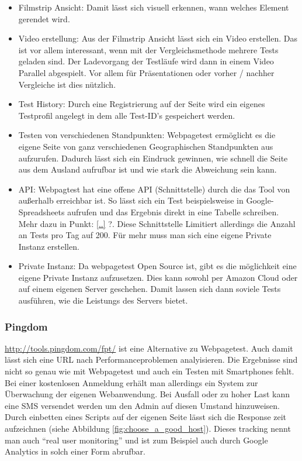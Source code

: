 \begin{itemize}
				\item Filmstrip Ansicht: Damit lässt sich visuell erkennen, wann welches Element gerendet wird.

				\item Video erstellung: Aus der Filmstrip Ansicht lässt sich ein Video erstellen. Das ist vor allem interessant, wenn mit der Vergleichsmethode mehrere Tests geladen sind. Der Ladevorgang der Testläufe wird dann in einem Video Parallel abgespielt. Vor allem für Präsentationen oder vorher / nachher Vergleiche ist dies nützlich.

				\item Test History: Durch eine Registrierung auf der Seite wird ein eigenes Testprofil angelegt in dem alle Test-ID's gespeichert werden.

				\item Testen von verschiedenen Standpunkten: Webpagetest ermöglicht es die eigene Seite von ganz verschiedenen Geographischen Standpunkten aus aufzurufen. Dadurch lässt sich ein Eindruck gewinnen, wie schnell die Seite aus dem Ausland aufrufbar ist und wie stark die Abweichung sein kann.

				\item API: Webpagtest hat eine offene API (Schnittstelle) durch die das Tool von außerhalb erreichbar ist. So lässt sich ein Test beispielsweise in Google-Spreadsheets aufrufen und das Ergebnis direkt in eine Tabelle schreiben. Mehr dazu in Punkt: \ref{..} ?. Diese Schnittstelle Limitiert allerdings die Anzahl an Tests pro Tag auf 200. Für mehr muss man sich eine eigene Private Instanz erstellen. 

				\item Private Instanz: Da webpagetest Open Source ist, gibt es die möglichkeit eine eigene Private Instanz aufzusetzen. Dies kann sowohl per Amazon Cloud oder auf einem eigenen Server geschehen. Damit lassen sich dann soviele Tests ausführen, wie die Leistungs des Servers bietet.

			\end{itemize}

		\subsubsection{Pingdom} %
		\label{ssub:pingdom}
			\url{http://tools.pingdom.com/fpt/} ist eine Alternative zu Webpagetest. Auch damit lässt sich eine URL nach Performanceproblemen analyisieren. Die Ergebnisse sind nicht so genau wie mit Webpagetest und auch ein Testen mit Smartphones fehlt. Bei einer kostenlosen Anmeldung erhält man allerdings ein System zur Überwachung der eigenen Webanwendung. Bei Ausfall oder zu hoher Last kann eine SMS versendet werden um den Admin auf diesen Umstand hinzuweisen. Durch einbetten eines Scripts auf der eigenen Seite lässt sich die Response zeit aufzeichnen (siehe Abbildung \ref{fig:choose_a_good_host}). Dieses tracking nennt man auch "`real user monitoring"' und ist zum Beispiel auch durch Google Analytics in solch einer Form abrufbar.

